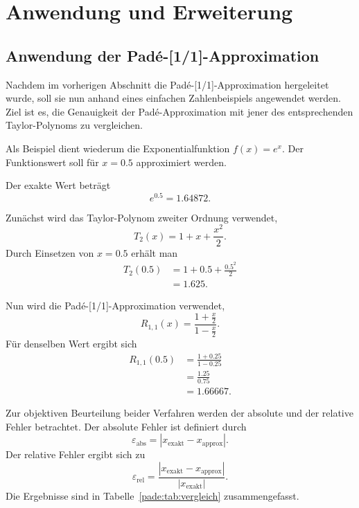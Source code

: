 %
\section{Anwendung und Erweiterung}
\label{pade:section:anwendung}

\subsection{Anwendung der Padé-[1/1]-Approximation}
\label{pade:subsection:beispiel}

Nachdem im vorherigen Abschnitt die Padé-[1/1]-Approximation hergeleitet wurde, soll sie nun anhand eines einfachen Zahlenbeispiels angewendet werden. Ziel ist es, die Genauigkeit der Padé-Approximation mit jener des entsprechenden Taylor-Polynoms zu vergleichen.

Als Beispiel dient wiederum die Exponentialfunktion \(f(x)=e^x\). Der Funktionswert soll für \(x=0.5\) approximiert werden.
%

Der exakte Wert beträgt
\begin{equation*}
	e^{0.5}
	=
	1.64872.
\end{equation*}

Zunächst wird das Taylor-Polynom zweiter Ordnung verwendet,
\begin{equation}
	T_2(x)
	=
	1+x+\frac{x^2}{2}.
	\label{pade:eq:taylor2}
\end{equation}
Durch Einsetzen von \(x=0.5\) erhält man
\begin{align*}
	T_2(0.5)
	&=
	1
	+
	0.5
	+
	\frac{0.5^2}{2}
	\\
	&=
	1.625.
\end{align*}

Nun wird die Padé-[1/1]-Approximation verwendet,
%
\begin{equation}
	R_{1,1}(x)
	=
	\frac{1+\frac{x}{2}}
	{1-\frac{x}{2}}.
	\label{pade:eq:pade11_beispiel}
\end{equation}
Für denselben Wert ergibt sich
\begin{align*}
	R_{1,1}(0.5)
	&=
	\frac{1+0.25}
	{1-0.25}
	\\
	&=
	\frac{1.25}{0.75}
	\\
	&=
	1.66667.
\end{align*}

Zur objektiven Beurteilung beider Verfahren werden der absolute und der relative Fehler betrachtet. Der absolute Fehler ist definiert durch
%
\begin{equation*}
	\varepsilon_{\mathrm{abs}}
	=
	|x_{\mathrm{exakt}}-x_{\mathrm{approx}}|.
\end{equation*}
Der relative Fehler ergibt sich zu
\begin{equation*}
	\varepsilon_{\mathrm{rel}}
	=
	\frac{|x_{\mathrm{exakt}}-x_{\mathrm{approx}}|}
	{|x_{\mathrm{exakt}}|}.
\end{equation*}
Die Ergebnisse sind in Tabelle~\ref{pade:tab:vergleich} zusammengefasst.

